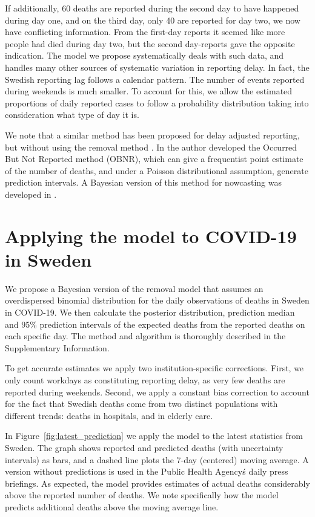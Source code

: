 \documentclass[a4paper,11pth]{article}
\begin{document}
If additionally, 60 deaths are reported during the second day to have happened during day one, and on the third day, only 40 are reported for day two, we now have conflicting information. From the first-day reports it seemed like more people had died during day two, but the second day-reports gave the opposite indication. The model we propose systematically deals with such data, and handles many other sources of systematic variation in reporting delay. In fact, the Swedish reporting lag follows a calendar pattern. The number of events reported during weekends is much smaller. To account for this, we allow the estimated proportions of daily reported cases to follow a probability distribution taking into consideration what type of day it is.

We note that a similar method has been proposed for delay adjusted reporting, but without using the removal method \cite{lawless1994adjustments}. In \cite{lawless1994adjustments} the author developed the Occurred But Not Reported method (OBNR), which can give a frequentist point estimate of the number of deaths, and under a Poisson distributional assumption, generate prediction intervals. A Bayesian version of this method for nowcasting was developed in \cite{hohle2014bayesian}.

\section{Applying the model to COVID-19 in Sweden}
We propose a Bayesian version of the removal model that assumes an overdispersed binomial distribution for the daily observations of deaths in Sweden in COVID-19. We then calculate the posterior distribution, prediction median and 95\% prediction intervals of the expected deaths from the reported deaths on each specific day. The method and algorithm is thoroughly described in the Supplementary Information.

To get accurate estimates we apply two institution-specific corrections. First, we only count workdays as constituting reporting delay, as very few deaths are reported during weekends. Second, we apply a constant bias correction to account for the fact that Swedish deaths come from two distinct populations with different trends: deaths in hospitals, and in elderly care.

In Figure~\ref{fig:latest_prediction} we apply the model to the latest statistics from Sweden. The graph shows reported and predicted deaths (with uncertainty intervals) as bars, and a dashed line plots the 7-day (centered) moving average. A version without predictions is used in the Public Health Agency\'s daily press briefings. As expected, the model provides estimates of actual deaths considerably above the reported number of deaths. We note specifically how the model predicts additional deaths above the moving average line.
\end{document}
